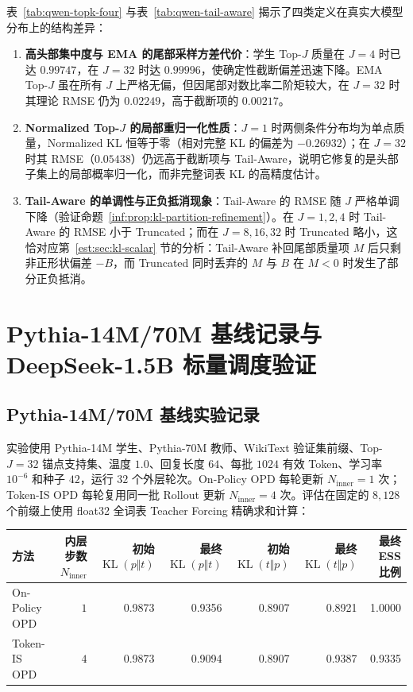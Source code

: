 \documentclass[lang=cn,scheme=chinese,openany]{elegantbook}
\newcommand{\KL}{\operatorname{KL}}
\begin{document}
表~\ref{tab:qwen-topk-four} 与表~\ref{tab:qwen-tail-aware} 揭示了四类定义在真实大模型分布上的结构差异：
\begin{enumerate}
\item \textbf{高头部集中度与 EMA 的尾部采样方差代价}：学生 Top-$J$ 质量在 $J=4$ 时已达 $0.99747$，在 $J=32$ 时达 $0.99996$，使确定性截断偏差迅速下降。EMA Top-$J$ 虽在所有 $J$ 上严格无偏，但因尾部对数比率二阶矩较大，在 $J=32$ 时其理论 RMSE 仍为 $0.02249$，高于截断项的 $0.00217$。
\item \textbf{Normalized Top-$J$ 的局部重归一化性质}：$J=1$ 时两侧条件分布均为单点质量，Normalized KL 恒等于零（相对完整 KL 的偏差为 $-0.26932$）；在 $J=32$ 时其 RMSE（$0.05438$）仍远高于截断项与 Tail-Aware，说明它修复的是头部子集上的局部概率归一化，而非完整词表 KL 的高精度估计。
\item \textbf{Tail-Aware 的单调性与正负抵消现象}：Tail-Aware 的 RMSE 随 $J$ 严格单调下降（验证命题~\ref{inf:prop:kl-partition-refinement}）。在 $J=1,2,4$ 时 Tail-Aware 的 RMSE 小于 Truncated；而在 $J=8,16,32$ 时 Truncated 略小，这恰对应第~\ref{est:sec:kl-scalar} 节的分析：Tail-Aware 补回尾部质量项 $M$ 后只剩非正形状偏差 $-B$，而 Truncated 同时丢弃的 $M$ 与 $B$ 在 $M<0$ 时发生了部分正负抵消。
\end{enumerate}

\section{Pythia-14M/70M 基线记录与 DeepSeek-1.5B 标量调度验证}
\label{subsec:ch2-opd-baseline-results}
\label{evidence:scalar}

\subsection{Pythia-14M/70M 基线实验记录}

实验使用 Pythia-14M 学生、Pythia-70M 教师、WikiText 验证集前缀、Top-$J=32$ 锚点支持集、温度 $1.0$、回复长度 $64$、每批 $1024$ 有效 Token、学习率 $10^{-6}$ 和种子 $42$，运行 $32$ 个外层轮次。On-Policy OPD 每轮更新 $N_{\mathrm{inner}}=1$ 次；Token-IS OPD 每轮复用同一批 Rollout 更新 $N_{\mathrm{inner}}=4$ 次。评估在固定的 $8,128$ 个前缀上使用 float32 全词表 Teacher Forcing 精确求和计算：

\begin{center}
\small
\setlength{\tabcolsep}{3pt}
\begin{tabular}{lrrrrrr}
\toprule
方法 & 内层步数 $N_{\mathrm{inner}}$ & 初始 $\KL(p\Vert t)$ & 最终 $\KL(p\Vert t)$ & 初始 $\KL(t\Vert p)$ & 最终 $\KL(t\Vert p)$ & 最终 ESS 比例\\
\midrule
On-Policy OPD & $1$ & 0.9873 & 0.9356 & 0.8907 & 0.8921 & 1.0000\\
Token-IS OPD & $4$ & 0.9873 & 0.9094 & 0.8907 & 0.9387 & 0.9335\\
\bottomrule
\end{tabular}
\end{center}
\end{document}
